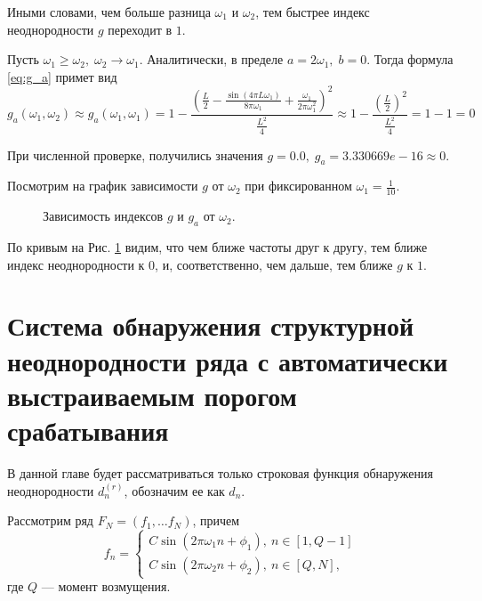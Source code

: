 \documentclass[specialist, substylefile = spbu.rtx,
			   subf, href, 12pt]{disser}
\begin{document}
Иными словами, чем больше разница $ \omega_1 $ и $ \omega_2 $, тем быстрее индекс неоднородности $ g $ переходит в $ 1 $.

Пусть $ \omega_1 \geq \omega_2, \; \omega_2 \rightarrow \omega_1 $. Аналитически, в пределе $ a = 2\omega_1,\; b = 0 $. Тогда формула \eqref{eq:g_a} примет вид 
$$ g_a(\omega_1, \omega_2) \approx g_a(\omega_1, \omega_1) = 1 - \frac{(\frac{L}{2} - \frac{\sin(4\pi L\omega_1)}{8\pi\omega_1} + \frac{\omega_1}{2\pi\omega_1^2})^2}{\frac{L^2}{4}} \approx 1 - \frac{(\frac{L}{2})^2}{\frac{L^2}{4}} = 1 - 1 = 0 $$

При численной проверке, получились значения $ g = 0.0,\; g_a = 3.330669e-16 \approx 0 $.

Посмотрим на график зависимости $ g $ от $ \omega_2 $ при фиксированном $ \omega_1 = \frac{1}{10} $.

\begin{figure}[!hhh]
	\caption{Зависимость индексов $ g $ и $ g_a $ от $ \omega_2 $.}
	\label{pic:g_c_vs_g_a_from_w_2}
\end{figure}

По кривым на Рис. \ref{pic:g_c_vs_g_a_from_w_2} видим, что чем ближе частоты друг к другу, тем ближе индекс неоднородности к $ 0 $, и, соответственно, чем дальше, тем ближе $ g $ к $ 1 $.


\newpage
\chapter{Система обнаружения структурной неоднородности ряда с автоматически выстраиваемым порогом срабатывания} \label{sec:ch_5}

В данной главе будет рассматриваться только строковая функция обнаружения неоднородности $ d_n^{(r)} $, обозначим ее как $ d_n $.


Рассмотрим ряд $ F_N = (f_1, \dots f_{N}) $, причем  
\begin{equation*} 
	f_n = 
	\begin{cases} 
		C\sin(2\pi\omega_1 n + \phi_1),\ n \in [1, Q-1] \\ 
		C\sin(2\pi\omega_2 n + \phi_2),\ n \in [Q, N], 
	\end{cases} 
\end{equation*} 
где $ Q $ --- момент возмущения. 
\end{document}
